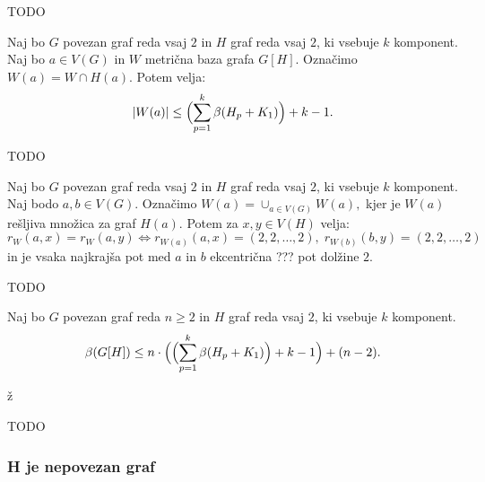\documentclass[mat1, tisk]{fmfdelo}
\newcommand{\1}{(1, 1, \ldots, 1)}
\newcommand{\2}{(2, 2, \ldots, 2)}
\begin{document}
\begin{dokaz}
    TODO
\end{dokaz}


\begin{lema}
    Naj bo $G$ povezan graf reda vsaj $2$ in $H$ graf reda vsaj $2$, ki vsebuje $k$ komponent.
    Naj bo $a \in V(G)$ in $W$ metrična baza grafa $G[H].$ Označimo $W(a) = W \cap H(a).$ Potem velja:
    $$|W(a)| \leq \Bigl ( \sum_{p=1}^{k} \beta(H_p + K_1) \Bigr ) + k - 1.$$
\end{lema}

\begin{dokaz}
    TODO
\end{dokaz}


\begin{lema}
    Naj bo $G$ povezan graf reda vsaj $2$ in $H$ graf reda vsaj $2$, ki vsebuje $k$ komponent.
    Naj bodo $a, b \in V(G)$. Označimo $W(a) = \cup_{a \in V(G)} W(a),$ kjer je $W(a)$ rešljiva množica za graf 
    $H(a)$. Potem za $x, y \in V(H)$ velja:
    $$r_W(a, x) = r_W(a, y) \Leftrightarrow r_{W(a)}(a,x) = \2, \; r_{W(b)}(b,y) = \2$$ in je vsaka najkrajša pot med
    $a$ in $b$ ekcentrična ??? pot dolžine $2$.
\end{lema}

\begin{dokaz}
    TODO
\end{dokaz}

\begin{lema}
    Naj bo $G$ povezan graf reda $n \geq 2$ in $H$ graf reda vsaj $2$, ki vsebuje $k$ komponent.
    $$\beta(G[H]) \leq 
    n \cdot \Bigl ( \Bigl ( \sum_{p=1}^{k} \beta(H_p + K_1) \Bigr ) + k - 1  \Bigr ) + (n-2). $$
\end{lema}ž

\begin{dokaz}
    TODO
\end{dokaz}


\subsubsection{H je nepovezan graf} \label{sss:nepovezan}
\end{document}
